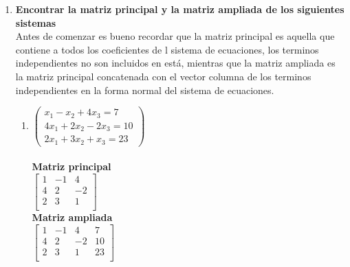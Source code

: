 \documentclass[12pt]{article}
\begin{document}
\begin{enumerate}
	\item {\bf Encontrar la matriz principal y la matriz ampliada de los siguientes sistemas} \\ Antes de comenzar es bueno recordar que la matriz principal es aquella que contiene a todos los coeficientes de l sistema de ecuaciones, los terminos independientes no son incluidos en est\'a, mientras que la matriz ampliada es la matriz principal concatenada con el vector columna de los terminos independientes en la forma normal del sistema de ecuaciones.
	
\begin{multicols}{2}
	\begin{enumerate}
		\item $\begin{pmatrix}
				 x_1 - x_2 +4x_3 =  7 \\
				4x_1 +2x_2 -2x_3 = 10 \\
				2x_1 +3x_2 + x_3 = 23
			\end {pmatrix}$
			\\\ \\ \bf Matriz principal \\
			$\begin{bmatrix}
				1 &-1 & 4 \\
				4 & 2 &-2 \\
				2 & 3 & 1 \\
			\end{bmatrix}$
			\\ \bf Matriz ampliada \\
			$\begin{bmatrix}
				1 &-1 & 4 &  7\\
				4 & 2 &-2 & 10\\
				2 & 3 & 1 & 23\\
			\end{bmatrix}$\\\ \\
			

\end{enumerate}
\end{multicols}
\end{enumerate}
\end{document}
